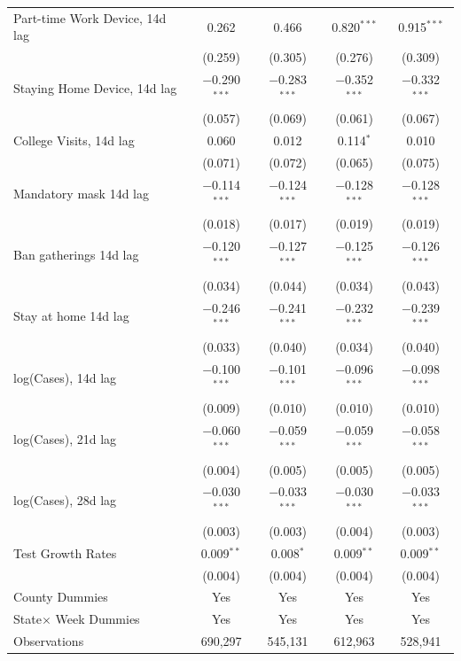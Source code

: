 \documentclass[9pt,twoside,lineno]{pnas-new}
\theoremstyle{definition}
\begin{document}
\begin{table}[!htbp]
{\begin{tabular}{@{\extracolsep{1pt}}lcc|cc}
 Part-time Work Device, 14d  lag & 0.262 & 0.466 & 0.820$^{***}$ & 0.915$^{***}$ \\ 
  & (0.259) & (0.305) & (0.276) & (0.309) \\ 
 Staying Home Device, 14d  lag& $-$0.290$^{***}$ & $-$0.283$^{***}$ & $-$0.352$^{***}$ & $-$0.332$^{***}$ \\ 
  & (0.057) & (0.069) & (0.061) & (0.067) \\ \hline
 College Visits, 14d  lag  & 0.060 & 0.012 & 0.114$^{*}$ & 0.010 \\ 
  & (0.071) & (0.072) & (0.065) & (0.075) \\ 
  Mandatory mask 14d  lag & $-$0.114$^{***}$ & $-$0.124$^{***}$ & $-$0.128$^{***}$ & $-$0.128$^{***}$ \\ 
  & (0.018) & (0.017) & (0.019) & (0.019) \\ 
 Ban gatherings 14d  lag & $-$0.120$^{***}$ & $-$0.127$^{***}$ & $-$0.125$^{***}$ & $-$0.126$^{***}$ \\ 
  & (0.034) & (0.044) & (0.034) & (0.043) \\ 
  Stay at home 14d  lag & $-$0.246$^{***}$ & $-$0.241$^{***}$ & $-$0.232$^{***}$ & $-$0.239$^{***}$ \\ 
  & (0.033) & (0.040) & (0.034) & (0.040) \\  \hline
   log(Cases), 14d  lag & $-$0.100$^{***}$ & $-$0.101$^{***}$ & $-$0.096$^{***}$ & $-$0.098$^{***}$ \\ 
  & (0.009) & (0.010) & (0.010) & (0.010) \\ 
   log(Cases), 21d  lag & $-$0.060$^{***}$ & $-$0.059$^{***}$ & $-$0.059$^{***}$ & $-$0.058$^{***}$ \\ 
  & (0.004) & (0.005) & (0.005) & (0.005) \\ 
   log(Cases), 28d  lag& $-$0.030$^{***}$ & $-$0.033$^{***}$ & $-$0.030$^{***}$ & $-$0.033$^{***}$ \\ 
  & (0.003) & (0.003) & (0.004) & (0.003) \\ 
  Test Growth Rates & 0.009$^{**}$ & 0.008$^{*}$ & 0.009$^{**}$ & 0.009$^{**}$ \\ 
  & (0.004) & (0.004) & (0.004) & (0.004) \\ 
 \hline %
County Dummies & Yes & Yes &  Yes  &  Yes  \\   
State$\times$ Week Dummies&Yes & Yes &  Yes  &  Yes  \\
\hline %
Observations & 690,297 & 545,131 & 612,963 & 528,941 \\ 

\end{tabular}}
\end{table}
\end{document}
